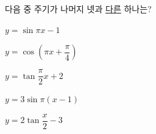 다음 중 주기가 나머지 넷과 \underline{다른} 하나는?
\begin{choicesii}{\rule[-3ex]{0pt}{8ex}$y=\sin\pi x-1$}{\rule[-3ex]{0pt}{8ex}$y=\cos\left(\pi x+\dfrac{\pi}{4}\right)$}{\rule[-3ex]{0pt}{8ex}$y=\tan\dfrac{\pi}{2}x+2$}{\rule[-3ex]{0pt}{8ex}$y=3\sin\pi(x-1)$}{\rule[-3ex]{0pt}{8ex}$y=2\tan\dfrac{x}{2}-3$}\end{choicesii}

